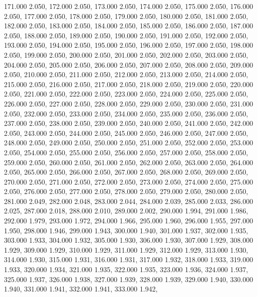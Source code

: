 171.000 2.050, 
172.000 2.050, 
173.000 2.050, 
174.000 2.050, 
175.000 2.050, 
176.000 2.050, 
177.000 2.050, 
178.000 2.050, 
179.000 2.050, 
180.000 2.050, 
181.000 2.050, 
182.000 2.050, 
183.000 2.050, 
184.000 2.050, 
185.000 2.050, 
186.000 2.050, 
187.000 2.050, 
188.000 2.050, 
189.000 2.050, 
190.000 2.050, 
191.000 2.050, 
192.000 2.050, 
193.000 2.050, 
194.000 2.050, 
195.000 2.050, 
196.000 2.050, 
197.000 2.050, 
198.000 2.050, 
199.000 2.050, 
200.000 2.050, 
201.000 2.050, 
202.000 2.050, 
203.000 2.050, 
204.000 2.050, 
205.000 2.050, 
206.000 2.050, 
207.000 2.050, 
208.000 2.050, 
209.000 2.050, 
210.000 2.050, 
211.000 2.050, 
212.000 2.050, 
213.000 2.050, 
214.000 2.050, 
215.000 2.050, 
216.000 2.050, 
217.000 2.050, 
218.000 2.050, 
219.000 2.050, 
220.000 2.050, 
221.000 2.050, 
222.000 2.050, 
223.000 2.050, 
224.000 2.050, 
225.000 2.050, 
226.000 2.050, 
227.000 2.050, 
228.000 2.050, 
229.000 2.050, 
230.000 2.050, 
231.000 2.050, 
232.000 2.050, 
233.000 2.050, 
234.000 2.050, 
235.000 2.050, 
236.000 2.050, 
237.000 2.050, 
238.000 2.050, 
239.000 2.050, 
240.000 2.050, 
241.000 2.050, 
242.000 2.050, 
243.000 2.050, 
244.000 2.050, 
245.000 2.050, 
246.000 2.050, 
247.000 2.050, 
248.000 2.050, 
249.000 2.050, 
250.000 2.050, 
251.000 2.050, 
252.000 2.050, 
253.000 2.050, 
254.000 2.050, 
255.000 2.050, 
256.000 2.050, 
257.000 2.050, 
258.000 2.050, 
259.000 2.050, 
260.000 2.050, 
261.000 2.050, 
262.000 2.050, 
263.000 2.050, 
264.000 2.050, 
265.000 2.050, 
266.000 2.050, 
267.000 2.050, 
268.000 2.050, 
269.000 2.050, 
270.000 2.050, 
271.000 2.050, 
272.000 2.050, 
273.000 2.050, 
274.000 2.050, 
275.000 2.050, 
276.000 2.050, 
277.000 2.050, 
278.000 2.050, 
279.000 2.050, 
280.000 2.050, 
281.000 2.049, 
282.000 2.048, 
283.000 2.044, 
284.000 2.039, 
285.000 2.033, 
286.000 2.025, 
287.000 2.018, 
288.000 2.010, 
289.000 2.002, 
290.000 1.994, 
291.000 1.986, 
292.000 1.979, 
293.000 1.972, 
294.000 1.966, 
295.000 1.960, 
296.000 1.955, 
297.000 1.950, 
298.000 1.946, 
299.000 1.943, 
300.000 1.940, 
301.000 1.937, 
302.000 1.935, 
303.000 1.933, 
304.000 1.932, 
305.000 1.930, 
306.000 1.930, 
307.000 1.929, 
308.000 1.929, 
309.000 1.929, 
310.000 1.929, 
311.000 1.929, 
312.000 1.929, 
313.000 1.930, 
314.000 1.930, 
315.000 1.931, 
316.000 1.931, 
317.000 1.932, 
318.000 1.933, 
319.000 1.933, 
320.000 1.934, 
321.000 1.935, 
322.000 1.935, 
323.000 1.936, 
324.000 1.937, 
325.000 1.937, 
326.000 1.938, 
327.000 1.939, 
328.000 1.939, 
329.000 1.940, 
330.000 1.940, 
331.000 1.941, 
332.000 1.941, 
333.000 1.942, 
